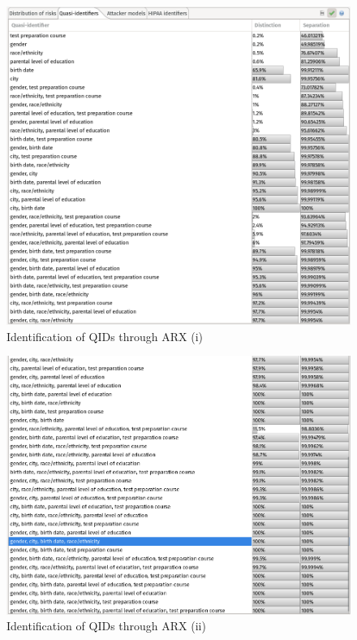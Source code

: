 \documentclass[a4paper, 11pt]{article}
\begin{document}
\begin{figure}[H]
	\centering
	\includegraphics[width=\textwidth]{img/qid-1.png}
	\caption{Identification of QIDs through ARX (i)}
	\label{fig:arx-qid-1}
\end{figure}

\begin{figure}[H]
	\centering
	\includegraphics[width=\textwidth]{img/qid-2.png}
	\caption{Identification of QIDs through ARX (ii)}
	\label{fig:arx-qid-2}
\end{figure}
\end{document}
